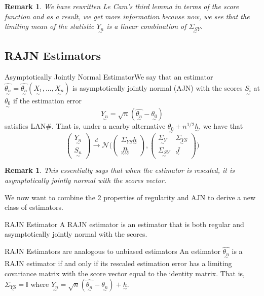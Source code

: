 \documentclass[twoside]{article}
\newtheorem{remark}[theorem]{Remark}
\newcommand{\utilde}{\underset{\sim}}
\begin{document}
\begin{remark}We have rewritten Le Cam's third lemma in terms of the score function and as a result, we get more information because now, we see that the limiting mean of the statistic $\utilde{Y_n}$ is a linear combination of $\utilde{\Sigma_{SY}}.$
\end{remark}


\subsection{RAJN Estimators}

\begin{definition_exam}{Asymptotically Jointly Normal Estimator}{}We say that an estimator $\hat{\utilde{\theta_n}} = \hat{\utilde{\theta_n}}(\utilde{X_1},...,\utilde{X_n})$ is asymptotically jointly normal (AJN) with the scores $\utilde{S_i}$ at $\utilde{\theta_0}$ if the estimation error
$$
\utilde{Y_n} = \sqrt{n}(\hat{\utilde{\theta_n}} - \utilde{\theta_0})
$$
satisfies LAN\#. That is, under a nearby alternative $\utilde{\theta_0} + n^{1/2}\utilde{h}$, we have that 
$$
\begin{pmatrix}
\utilde{Y_n}\\
\utilde{S_n}
\end{pmatrix}
\xrightarrow{d}
\mathcal{N}\bigg(
\begin{pmatrix}
\Sigma_{YS}\utilde{h}\\
\utilde{J}\utilde{h}
\end{pmatrix}
  ,
\begin{pmatrix}
\utilde{\Sigma_Y} & \utilde{\Sigma_{YS}} \\
\utilde{\Sigma_{SY}} & \utilde{J}
\end{pmatrix}
 \bigg)
$$
\end{definition_exam}

\begin{remark}This essentially says that when the estimator is rescaled, it is asymptotically jointly normal with the scores vector.
\end{remark}

We now want to combine the 2 properties of regularity and AJN to derive a new class of estimators.


\begin{definition_exam}{RAJN Estimator}{} A RAJN estimator is an estimator that is both regular and asymptotically jointly normal with the scores.
\end{definition_exam}

\begin{theorem_exam}{RAJN Estimators are analogous to unbiased estimators}{} An estimator $\hat{\utilde{\theta_n}}$ is a RAJN estimator if and only if its rescaled estimation error has a limiting covariance matrix with the score vector equal to the identity matrix. That is, $\Sigma_{\utilde{Y S}} = \mathbb{I}$ where $\utilde{Y_n} = \sqrt{n}( \hat{\utilde{\theta_n}} - \utilde{\theta_n}) + \utilde{h}$.
\end{theorem_exam}
\end{document}

